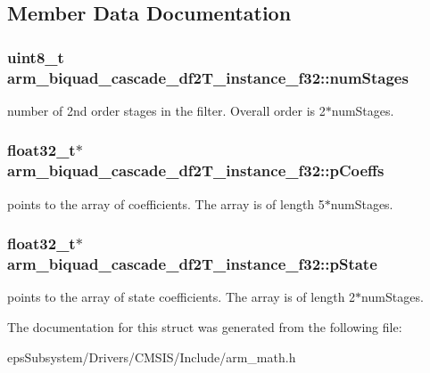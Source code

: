 \subsection{Member Data Documentation}
\hypertarget{structarm__biquad__cascade__df2_t__instance__f32_a4d17958c33c3d0a905f974bac50f033f}{
\subsubsection[{num\-Stages}]{\setlength{\rightskip}{0pt plus 5cm}uint8\-\_\-t arm\-\_\-biquad\-\_\-cascade\-\_\-df2\-T\-\_\-instance\-\_\-f32\-::num\-Stages}}\label{structarm__biquad__cascade__df2_t__instance__f32_a4d17958c33c3d0a905f974bac50f033f}
number of 2nd order stages in the filter. Overall order is 2$\ast$num\-Stages. \hypertarget{structarm__biquad__cascade__df2_t__instance__f32_a49a24fe1b6ad3b0b26779c32d8d80b2e}{
\subsubsection[{p\-Coeffs}]{\setlength{\rightskip}{0pt plus 5cm}float32\-\_\-t$\ast$ arm\-\_\-biquad\-\_\-cascade\-\_\-df2\-T\-\_\-instance\-\_\-f32\-::p\-Coeffs}}\label{structarm__biquad__cascade__df2_t__instance__f32_a49a24fe1b6ad3b0b26779c32d8d80b2e}
points to the array of coefficients. The array is of length 5$\ast$num\-Stages. \hypertarget{structarm__biquad__cascade__df2_t__instance__f32_a24d223addfd926a7177088cf2efe76b1}{
\subsubsection[{p\-State}]{\setlength{\rightskip}{0pt plus 5cm}float32\-\_\-t$\ast$ arm\-\_\-biquad\-\_\-cascade\-\_\-df2\-T\-\_\-instance\-\_\-f32\-::p\-State}}\label{structarm__biquad__cascade__df2_t__instance__f32_a24d223addfd926a7177088cf2efe76b1}
points to the array of state coefficients. The array is of length 2$\ast$num\-Stages. 

The documentation for this struct was generated from the following file\-:\begin{DoxyCompactItemize}
\item 
eps\-Subsystem/\-Drivers/\-C\-M\-S\-I\-S/\-Include/arm\-\_\-math.\-h\end{DoxyCompactItemize}
